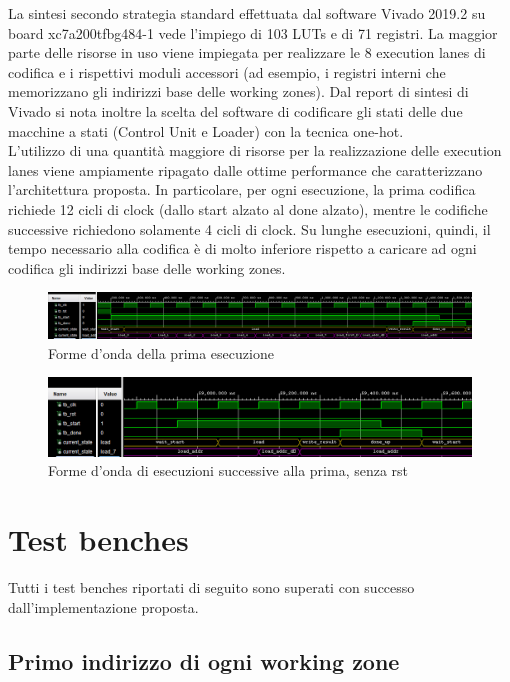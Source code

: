 \documentclass[10pt,english, openany]{book}
\begin{document}
La sintesi secondo strategia standard effettuata dal software Vivado 2019.2 su board xc7a200tfbg484-1 vede l’impiego di 103 LUTs e di 71 registri. La maggior parte delle risorse in uso viene impiegata per realizzare le 8 execution lanes di codifica e i rispettivi moduli accessori (ad esempio, i registri interni che memorizzano gli indirizzi base delle working zones). Dal report di sintesi di Vivado si nota inoltre la scelta del software di codificare gli stati delle due macchine a stati (Control Unit e Loader) con la tecnica one-hot.\\
L’utilizzo di una quantità maggiore di risorse per la realizzazione delle execution lanes viene ampiamente ripagato dalle ottime performance che caratterizzano l’architettura proposta. In particolare, per ogni esecuzione, la prima codifica richiede 12 cicli di clock (dallo start alzato al done alzato), mentre le codifiche successive richiedono solamente 4 cicli di clock. Su lunghe esecuzioni, quindi, il tempo necessario alla codifica è di molto inferiore rispetto a caricare ad ogni codifica gli indirizzi base delle working zones.\\
\begin{figure}[h!]
    \centering
    \includegraphics[scale=0.38]{waveforms_first_encode.PNG}
    \caption{Forme d'onda della prima esecuzione}
    \label{fig:first_encode}
\end{figure}{}
\begin{figure}[h!]
    \centering
    \includegraphics[scale=0.4]{waveforms_consecutive_encode.PNG}
    \caption{Forme d'onda di esecuzioni successive alla prima, senza rst}
    \label{fig:consecutive_encode}
\end{figure}{}

\chapter{Test benches}
Tutti i test benches riportati di seguito sono superati con successo dall'implementazione proposta.

\section{Primo indirizzo di ogni working zone}
\end{document}
